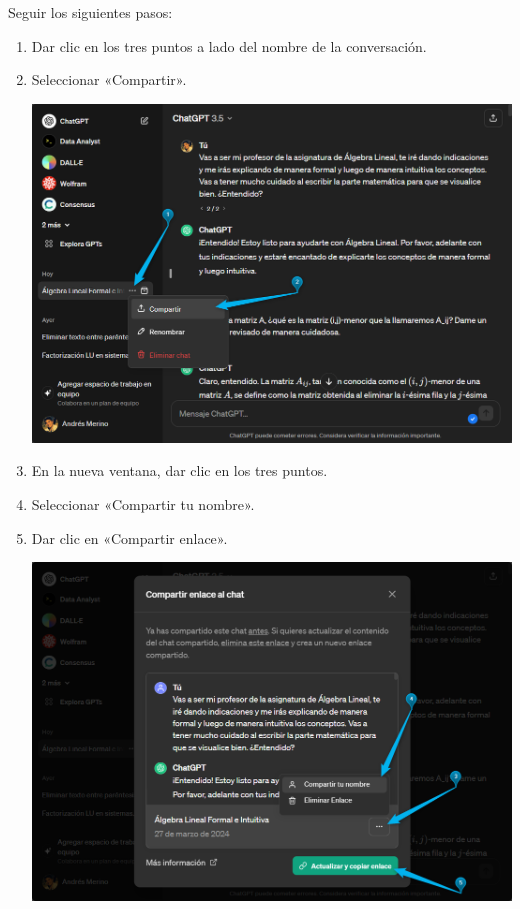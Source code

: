 \documentclass[a4,11pt]{aleph-notas}
\begin{document}
Seguir los siguientes pasos:
\begin{enumerate}
    \item Dar clic en los tres puntos a lado del nombre de la conversación.
    \item Seleccionar «Compartir».
    \begin{center}
        \includegraphics[width=0.85\linewidth]{fig01.png}
    \end{center}
    \item En la nueva ventana, dar clic en los tres puntos. 
    \item Seleccionar «Compartir tu nombre».
    \item Dar clic en «Compartir enlace».

    \begin{center}
        \includegraphics[width=0.85\linewidth]{fig02.png}
    \end{center}
\end{enumerate}
\end{document}
